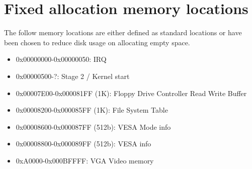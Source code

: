 \documentclass[10pt,a4paper]{article}
\begin{document}
\newpage
\section{Fixed allocation memory locations}
The follow memory locations are either defined as standard locations or have been chosen to reduce disk usage on allocating empty space.
\begin{itemize}
\item 0x00000000-0x00000050: IRQ
\item 0x00000500-?: Stage 2 / Kernel start
\item 0x00007E00-0x000081FF (1K): Floppy Drive Controller Read Write Buffer
\item 0x00008200-0x000085FF (1K): File System Table
\item 0x00008600-0x000087FF (512b): VESA Mode info 
\item 0x00008800-0x000089FF (512b): VESA info 
\item 0xA0000-0x000BFFFF: VGA Video memory

\end{itemize}
\end{document}
